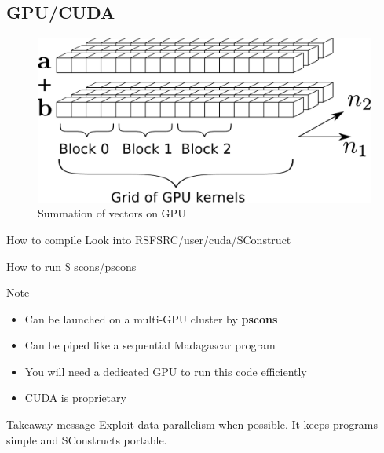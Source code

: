 \subsection{GPU/CUDA}

\begin{frame}
  \vspace{1.0cm}
  \begin{figure}
  \includegraphics[scale=0.55]{Fig/abcgpu.pdf}
  \caption{Summation of vectors on GPU}
  \end{figure}
\end{frame}

\begin{frame}
\end{frame}
\begin{frame}
\end{frame}
\begin{frame}
\end{frame}
\begin{frame}
\end{frame}

\begin{frame}
  \begin{block}{How to compile}
    Look into RSFSRC/user/cuda/SConstruct 
  \end{block}
  \begin{block}{How to run}
    \$ scons/pscons
  \end{block}
  \begin{block}{Note}
    \begin{itemize}
      \item Can be launched on a multi-GPU cluster by {\bf pscons}
      \item Can be piped like a sequential Madagascar program
      \item You will need a dedicated GPU to run this code efficiently
      \item CUDA is proprietary
    \end{itemize}
  \end{block}
\end{frame}

\begin{frame}
  \begin{block}{Takeaway message}
    Exploit data parallelism when possible. It keeps programs simple and
    SConstructs portable.
  \end{block}
\end{frame}

